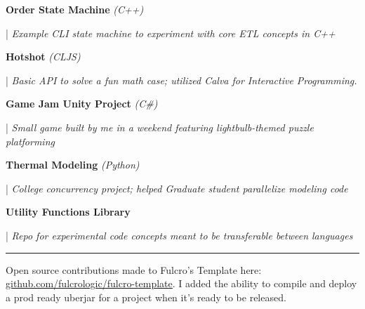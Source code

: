 \documentclass[letterpaper,11pt]{article}
\begin{document}
\begin{minipage}[t]{0.28\textwidth}
	\raggedright
	\textbf{ Order State Machine }\textit{(C++)}\\
\end{minipage}
\hfill
\begin{minipage}[t]{0.70\textwidth}
	\raggedright
	|\textit{ Example CLI state machine to experiment with core ETL concepts in C++ } \\
\end{minipage}

\begin{minipage}[t]{0.28\textwidth}
	\raggedright
	\textbf{ Hotshot }\textit{(CLJS)}\\
\end{minipage}
\hfill
\begin{minipage}[t]{0.70\textwidth}
	\raggedright
	|\textit{ Basic API to solve a fun math case; utilized Calva for Interactive Programming.  } \\
\end{minipage}

\begin{minipage}[t]{0.28\textwidth}
	\raggedright
	\textbf{ Game Jam Unity Project }\textit{(C\#)} \\
\end{minipage}
\hfill
\begin{minipage}[t]{0.70\textwidth}
	\raggedright
	|\textit{ Small game built by me in a weekend featuring lightbulb-themed puzzle platforming} \\
\end{minipage}

\begin{minipage}[t]{0.28\textwidth}
	\raggedright
	\textbf{ Thermal Modeling }\textit{(Python)}\\
\end{minipage}
\hfill
\begin{minipage}[t]{0.70\textwidth}
	\raggedright
	|\textit{ College concurrency project; helped Graduate student parallelize modeling code } \\
\end{minipage}

\begin{minipage}[t]{0.28\textwidth}
	\raggedright
	\textbf{ Utility Functions Library } \\
\end{minipage}
\hfill
\begin{minipage}[t]{0.70\textwidth}
	\raggedright
	|\textit{ Repo for experimental code concepts meant to be transferable between languages } \\
\end{minipage}
\noindent\rule{19.5cm}{0.4pt}
Open source contributions made to Fulcro’s Template here:
\href{https://github.com/fulcrologic/fulcro-template}{\underline{github.com/fulcrologic/fulcro-template}}. I added the ability to compile and deploy a prod ready uberjar for a project when it's ready to be released.


\end{document}
